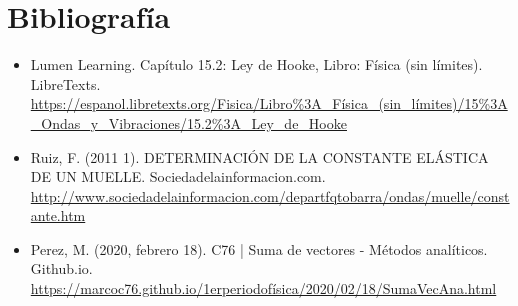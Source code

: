 \documentclass[10pt]{article}
\begin{document}
\section{Bibliografía}
\begin{itemize}
\item Lumen Learning. Capítulo 15.2: Ley de Hooke, Libro: Física (sin límites). LibreTexts.\\ \url{https://espanol.libretexts.org/Fisica/Libro\%3A_Física_(sin_límites)/15\%3A_Ondas_y_Vibraciones/15.2\%3A_Ley_de_Hooke}
\item Ruiz, F. (2011 1). DETERMINACIÓN DE LA CONSTANTE ELÁSTICA DE UN MUELLE. Sociedadelainformacion.com. \url{http://www.sociedadelainformacion.com/departfqtobarra/ondas/muelle/constante.htm}

\item Perez, M. (2020, febrero 18). C76 | Suma de vectores - Métodos analíticos. Github.io. \url{https://marcoc76.github.io/1erperiodofísica/2020/02/18/SumaVecAna.html}

\end{itemize}
\end{document}

